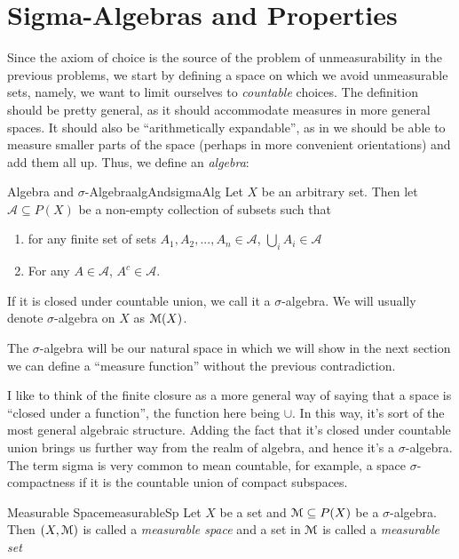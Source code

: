 \documentclass[oneside]{book}
\newcommand{\MM}{\EuScript{M}}
\newcommand{\sse}{\subseteq}
\begin{document}
\section{Sigma-Algebras and Properties}
Since the axiom of choice is the source of the problem of unmeasurability in the previous problems, we start by defining
a space on which we avoid unmeasurable sets, namely, we want to limit ourselves to \emph{countable} choices. The
definition should be pretty general, as it should accommodate measures in more general spaces. It should also be
``arithmetically expandable'', as in we should be able to measure smaller parts of the space (perhaps in more convenient
orientations) and add them all up. Thus, we define an \emph{algebra}:
\begin{defn}{Algebra and $\sigma$-Algebra}{algAndsigmaAlg}
	Let $X$ be an arbitrary set. Then let $\mathcal{A} \sse P(X)$ be a non-empty collection of subsets such that 
	\begin{enumerate}
		\item for any finite set of sets $A_1, A_2, ..., A_n \in \mathcal{A}$, $\bigcup_i A_i \in \mathcal{A}$
		\item For any $A \in \mathcal{A}$, $A^c \in \mathcal{A}$. 
	\end{enumerate}
	If it is closed under countable union, we call it a $\sigma$-algebra. We will usually denote $\sigma$-algebra on $X$
	as $\MM(X)$.
\end{defn}

The $\sigma$-algebra will be our natural space in which we will show in the next section we can define a ``measure
function'' without the previous contradiction. 

I like to think of the finite closure as a more general way of saying that a space is ``closed under
a function'', the function here being $\cup$. In this way, it's sort of the most general algebraic structure. Adding
the fact that it's closed under countable union brings us further way from the realm of algebra, and hence it's
a $\sigma$-algebra. The term sigma is very common to mean countable, for example, a space $\sigma$-compactness if it is
the countable union of compact subspaces. 

\begin{defn}{Measurable Space}{measurableSp}
	Let $X$ be a set and $\MM \sse P(X)$ be a $\sigma$-algebra. Then $(X, \MM)$ is called a \emph{measurable space} and
	a set in $\MM$ is called a \emph{measurable set}
\end{defn}
\end{document}
